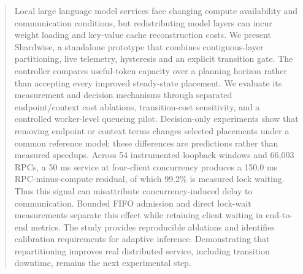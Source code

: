 \begin{abstract}
Local large language model services face changing compute availability and
communication conditions, but redistributing model layers can incur weight
loading and key-value cache reconstruction costs. We present Shardwise, a
standalone prototype that combines contiguous-layer partitioning, live telemetry,
hysteresis and an explicit transition gate. The controller compares useful-token
capacity over a planning horizon rather than accepting every improved
steady-state placement. We evaluate its measurement and decision mechanisms
through separated endpoint/context cost ablations, transition-cost sensitivity,
and a controlled worker-level queueing pilot. Decision-only experiments show
that removing endpoint or context terms changes selected placements under a
common reference model; these differences are predictions rather than measured
speedups. Across 54 instrumented loopback windows and 66,003 RPCs, a 50 ms service at
four-client concurrency produces a 150.0 ms RPC-minus-compute residual,
of which 99.2\% is measured lock waiting. Thus this signal can
misattribute concurrency-induced delay to communication. Bounded FIFO admission
and direct lock-wait measurements separate this effect while retaining client
waiting in end-to-end metrics. The study provides reproducible ablations and
identifies calibration requirements for adaptive inference. Demonstrating that
repartitioning improves real distributed service, including transition downtime,
remains the next experimental step.
\end{abstract}

